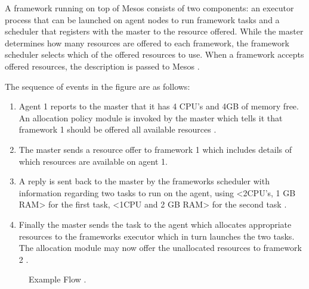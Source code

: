 \documentclass[9pt,twocolumn,twoside]{../../styles/osajnl}
\begin{document}
A framework running on top of Mesos consists of two components: an
executor process that can be launched on agent nodes to run framework
tasks and a scheduler that registers with the master to the resource
offered. While the master determines how many resources are offered to
each framework, the framework scheduler selects which of the offered
resources to use. When a framework accepts offered resources, the
description is passed to Mesos \cite{www-mesos-arch}.

The sequence of events in the figure are as follows:
\begin{enumerate}
\item Agent 1 reports to the master that it has 4 CPU's and 4GB of
  memory free.  An allocation policy module is invoked by the master
  which tells it that framework 1 should be offered all available
  resources \cite{www-mesos-arch}.
\item The master sends a resource offer to framework 1 which includes
  details of which resources are available on agent 1.
\item A reply is sent back to the master by the frameworks scheduler
  with information regarding two tasks to run on the agent, using
  <2CPU's, 1 GB RAM> for the first task, <1CPU and 2 GB RAM> for the
  second task \cite{www-mesos-arch}.
\item Finally the master sends the task to the agent which allocates
  appropriate resources to the frameworks executor which in turn
  launches the two tasks. The allocation module may now offer the
  unallocated resources to framework 2 \cite{www-mesos-arch}.
\end{enumerate}

\begin{figure}[htbp]
\centering
{}
\caption{Example Flow \cite{www-mesos-arch}.}
\label{fig:false-color}
\end{figure}
\end{document}

